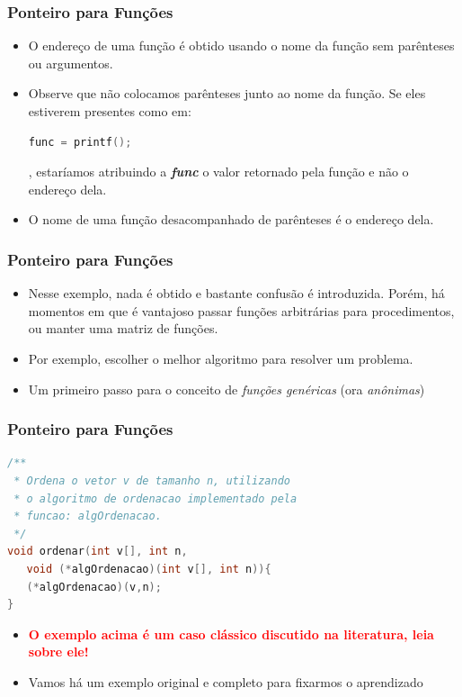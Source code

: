 \begin{frame}[fragile,c]
\frametitle{Ponteiro para Funções}
\begin{itemize}[<+->]
  \item O endereço de uma função é obtido usando o nome da função sem parênteses ou argumentos. 
  \item Observe que não colocamos parênteses junto ao nome da função. Se eles estiverem presentes como em:  
  
\begin{lstlisting}[language=C]
func = printf();
\end{lstlisting}, estaríamos atribuindo a \textit{\textbf{func}} o valor retornado pela função e não o endereço dela.
  \item \alert{O nome de uma função desacompanhado de parênteses é o endereço dela.}  

\end{itemize}

\end{frame}

\begin{frame}[fragile,c]
\frametitle{Ponteiro para Funções}

  \begin{itemize}[<+->]
    \item Nesse exemplo, nada é obtido e bastante confusão é introduzida. Porém, há momentos em que é vantajoso passar funções arbitrárias para procedimentos, ou manter uma matriz de funções.

    \item Por exemplo, escolher o melhor algoritmo para resolver um problema.
    
    \item Um primeiro passo para o conceito de \textit{funções genéricas} (ora \textit{anônimas})
    
  \end{itemize}

\end{frame}
\begin{frame}[fragile,c]
\frametitle{Ponteiro para Funções}
\begin{lstlisting}[language=C]
/**
 * Ordena o vetor v de tamanho n, utilizando 
 * o algoritmo de ordenacao implementado pela 
 * funcao: algOrdenacao.
 */
void ordenar(int v[], int n, 
   void (*algOrdenacao)(int v[], int n)){   
   (*algOrdenacao)(v,n);     
}
\end{lstlisting}  


\begin{itemize}
  \item  \textbf{\textcolor{red}{O exemplo acima é um caso clássico discutido na literatura, leia sobre ele!}}
  
  \item Vamos há um exemplo original e completo para fixarmos 
  o aprendizado

\end{itemize}
\end{frame}

